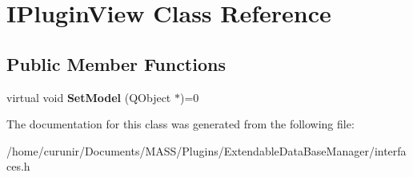 \hypertarget{class_i_plugin_view}{}\section{I\+Plugin\+View Class Reference}
\label{class_i_plugin_view}
\subsection*{Public Member Functions}
\begin{DoxyCompactItemize}
\item 
virtual void {\bfseries Set\+Model} (Q\+Object $\ast$)=0\hypertarget{class_i_plugin_view_a0da8ecfdc50ba7fb49c6db2dee6fbd81}{}\label{class_i_plugin_view_a0da8ecfdc50ba7fb49c6db2dee6fbd81}

\end{DoxyCompactItemize}


The documentation for this class was generated from the following file\+:\begin{DoxyCompactItemize}
\item 
/home/curunir/\+Documents/\+M\+A\+S\+S/\+Plugins/\+Extendable\+Data\+Base\+Manager/interfaces.\+h\end{DoxyCompactItemize}
